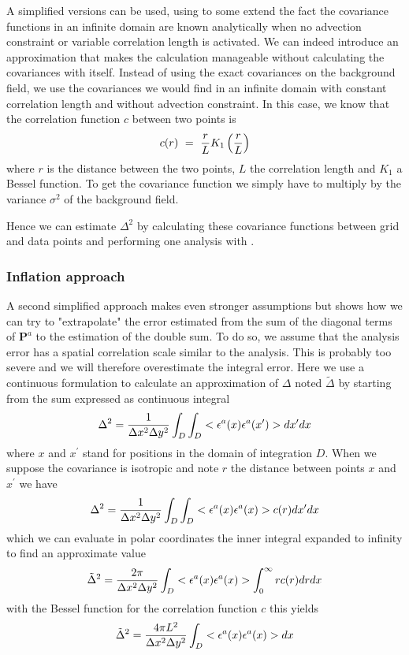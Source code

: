 A simplified versions can be used, using to some extend the fact the covariance functions in an infinite domain are known analytically when no
advection constraint or variable correlation length is activated. We can indeed introduce an approximation that makes the calculation manageable without calculating the covariances with \diva itself. Instead of using the exact covariances on the background field, we use the covariances we would find in an infinite domain with constant correlation length and without advection constraint. In this case, we know
that the correlation function $c$ between two points is
\begin{equation}
c(r) ~=~{r \over L} K_1 \left(r \over L\right)
\end{equation}
where $r$ is the distance between the two points, $L$ the correlation length and $K_1$ a Bessel function. To get the covariance function we simply have to multiply by the variance $\sigma^2$ of the background field.

Hence we can estimate $\Delta^2$ by calculating these covariance functions between grid and data points and performing one analysis with \diva.

\subsubsection{Inflation approach}

A second simplified approach makes even stronger assumptions but shows how we can try to "extrapolate" the error estimated from the sum of the diagonal terms of $\mathbf{P}^a$ to the estimation of the double sum. To do so, we assume that the analysis error has a spatial correlation scale similar to the analysis.
This is probably too severe and we will therefore overestimate the integral error. 
Here we use a continuous formulation to calculate an approximation of $\Delta$ noted $\tilde{\Delta}$ by starting from the sum expressed as continuous integral
\begin{equation}
{\Delta}^2= {1 \over \Delta x^2 \Delta y^2} \int_D \int_D <{\epsilon}^a(x) {\epsilon}^a(x^\prime)> d x^\prime d x 
\end{equation}
where $x$ and $x^\prime$ stand for positions in the domain of integration $D$. When we suppose the covariance is isotropic and note $r$ the distance between points
$x$ and $x^\prime$ we have 
\begin{equation}
{\Delta}^2= {1 \over \Delta x^2 \Delta y^2} \int_D \int_D <{\epsilon}^a(x) {\epsilon}^a(x) > c(r) d x^\prime d x  
\end{equation}
which we can evaluate in polar coordinates the inner integral expanded to infinity to find an approximate value
\begin{equation}
\tilde{\Delta}^2= {2 \pi \over \Delta x^2 \Delta y^2} \int_D <{\epsilon}^a(x) {\epsilon}^a(x) > \int_0^{\infty}  r c(r) d r d x
\end{equation}
with the Bessel function for the correlation function $c$ this yields
\begin{equation}
\tilde{\Delta}^2= {4 \pi L^2 \over \Delta x^2 \Delta y^2} \int_D <{\epsilon}^a(x) {\epsilon}^a(x) >  d x
\end{equation}

